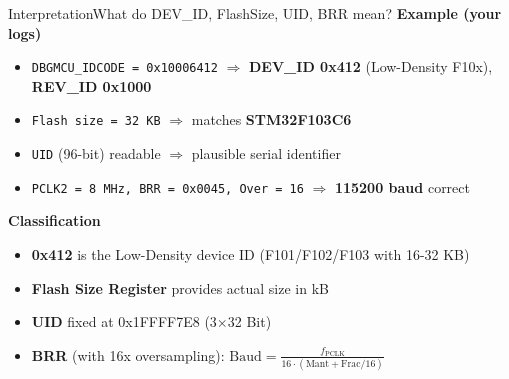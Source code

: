 \documentclass{beamer}
\begin{document}
\begin{frame}{Interpretation}{What do DEV\_ID, FlashSize, UID, BRR mean?}
	\textbf{Example (your logs)}
	\begin{itemize}
		\item \texttt{DBGMCU\_IDCODE = 0x10006412} $\Rightarrow$ \textbf{DEV\_ID 0x412} (Low-Density F10x), \textbf{REV\_ID 0x1000}
		\item \texttt{Flash size = 32 KB} $\Rightarrow$ matches \textbf{STM32F103C6}
		\item \texttt{UID} (96-bit) readable $\Rightarrow$ plausible serial identifier
		\item \texttt{PCLK2 = 8 MHz, BRR = 0x0045, Over = 16} $\Rightarrow$ \textbf{115200 baud} correct
	\end{itemize}
	
	\medskip
	\textbf{Classification}
	\begin{itemize}
		\item \textbf{0x412} is the Low-Density device ID (F101/F102/F103 with 16-32 KB)
		\item \textbf{Flash Size Register} provides actual size in kB
		\item \textbf{UID} fixed at 0x1FFFF7E8 (3$\times$32 Bit)
		\item \textbf{BRR} (with 16x oversampling): $\text{Baud}=\frac{f_{\text{PCLK}}}{16\cdot(\text{Mant}+\text{Frac}/16)}$
	\end{itemize}
\end{frame}
\end{document}
